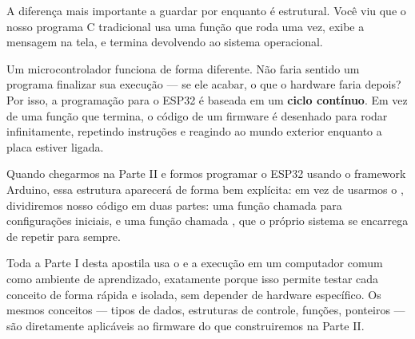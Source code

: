A diferença mais importante a guardar por enquanto é estrutural. Você viu que o nosso programa C tradicional usa uma função  que roda uma vez, exibe a mensagem na tela, e termina devolvendo  ao sistema operacional. 

Um microcontrolador funciona de forma diferente. Não faria sentido um programa finalizar sua execução — se ele acabar, o que o hardware faria depois? Por isso, a programação para o ESP32 é baseada em um \textbf{ciclo contínuo}. Em vez de uma função que termina, o código de um firmware é desenhado para rodar infinitamente, repetindo instruções e reagindo ao mundo exterior enquanto a placa estiver ligada. 

Quando chegarmos na Parte II e formos programar o ESP32 usando o framework Arduino, essa estrutura aparecerá de forma bem explícita: em vez de usarmos o , dividiremos nosso código em duas partes: uma função chamada  para configurações iniciais, e uma função chamada , que o próprio sistema se encarrega de repetir para sempre.

Toda a Parte I desta apostila usa o  e a execução em um computador comum como ambiente de aprendizado, exatamente porque isso permite testar cada conceito de forma rápida e isolada, sem depender de hardware específico. Os mesmos conceitos — tipos de dados, estruturas de controle, funções, ponteiros — são diretamente aplicáveis ao firmware do \ESP{} que construiremos na Parte II.
